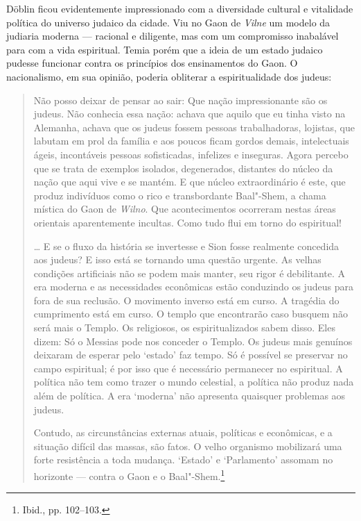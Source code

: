 \asterisc

Döblin ficou evidentemente impressionado com a diversidade cultural e
vitalidade política do universo judaico da cidade. Viu no Gaon de \textit{Vilne}
um modelo da judiaria moderna --- racional e diligente, mas com um
compromisso inabalável para com a vida espiritual. Temia porém que a
ideia de um estado judaico pudesse funcionar contra os princípios dos
ensinamentos do Gaon. O nacionalismo, em sua opinião, poderia obliterar
a espiritualidade dos judeus:

\begin{quote}
Não posso deixar de pensar ao sair: Que nação impressionante são os
judeus. Não conhecia essa nação: achava que aquilo que eu tinha visto na
Alemanha, achava que os judeus fossem pessoas trabalhadoras, lojistas,
que labutam em prol da família e aos poucos ficam gordos demais,
intelectuais ágeis, incontáveis pessoas sofisticadas, infelizes e
inseguras. Agora percebo que se trata de exemplos isolados, degenerados,
distantes do núcleo da nação que aqui vive e se mantém. E que núcleo
extraordinário é este, que produz indivíduos como o rico e transbordante
Baal"-Shem, a chama mística do Gaon de \textit{Wilno}. Que acontecimentos
ocorreram nestas áreas orientais aparentemente incultas. Como tudo flui
em torno do espiritual!

\ldots{} E se o fluxo da história se invertesse e Sion fosse realmente
concedida aos judeus? E isso está se tornando uma questão urgente. As
velhas condições artificiais não se podem mais manter, seu rigor é
debilitante. A era moderna e as necessidades econômicas estão conduzindo
os judeus para fora de sua reclusão. O movimento inverso está em curso.
A tragédia do cumprimento está em curso. O templo que encontrarão caso
busquem não será mais o Templo. Os religiosos, os espiritualizados sabem
disso. Eles dizem: Só o Messias pode nos conceder o Templo. Os judeus
mais genuínos deixaram de esperar pelo `estado' faz tempo. Só é possível
se preservar no campo espiritual; é por isso que é necessário permanecer
no espiritual. A política não tem como trazer o mundo celestial, a
política não produz nada além de política. A era `moderna' não apresenta
quaisquer problemas aos judeus.

Contudo, as circunstâncias externas atuais, políticas e econômicas, e a
situação difícil das massas, são fatos. O velho organismo mobilizará uma
forte resistência a toda mudança. `Estado' e `Parlamento' assomam no
horizonte --- contra o Gaon e o Baal"-Shem.\footnote{Ibid., pp. 102--103.}
\end{quote}

